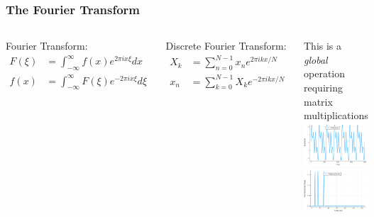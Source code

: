\documentclass{beamer}
\begin{document}
\begin{frame}
\frametitle{The Fourier Transform}

\begin{columns}
Fourier Transform:
\begin{align*}
F(\xi) &= \int_{-\infty}^{\infty}f(x)e^{2\pi i x \xi}dx\\
f(x) &= \int_{-\infty}^{\infty}F(\xi)e^{-2\pi i x \xi}d\xi
\end{align*}

Discrete Fourier Transform:
\begin{align*}
X_k &= \sum_{n=0}^{N-1} x_ne^{2\pi i k x / N}\\
x_n &= \sum_{k=0}^{N-1} X_ke^{-2\pi i k x / N}
\end{align*}

This is a \textit{global} operation requiring matrix multiplications
\includegraphics[width=\textwidth]{time_0066.png}
\includegraphics[width=\textwidth]{freq_0066.png}
\end{columns}
\end{frame}
\end{document}
